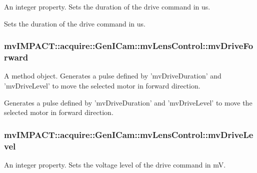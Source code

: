 An integer property. Sets the duration of the drive command in us. 

Sets the duration of the drive command in us. \hypertarget{classmv_i_m_p_a_c_t_1_1acquire_1_1_gen_i_cam_1_1mv_lens_control_a3aaebee0c8285e1be20c468a7f8e6342}{
\subsubsection[{mv\+Drive\+Forward}]{ mv\+I\+M\+P\+A\+C\+T\+::acquire\+::\+Gen\+I\+Cam\+::mv\+Lens\+Control\+::mv\+Drive\+Forward}}\label{classmv_i_m_p_a_c_t_1_1acquire_1_1_gen_i_cam_1_1mv_lens_control_a3aaebee0c8285e1be20c468a7f8e6342}


A method object. Generates a pulse defined by 'mv\+Drive\+Duration' and 'mv\+Drive\+Level' to move the selected motor in forward direction. 

Generates a pulse defined by 'mv\+Drive\+Duration' and 'mv\+Drive\+Level' to move the selected motor in forward direction. \hypertarget{classmv_i_m_p_a_c_t_1_1acquire_1_1_gen_i_cam_1_1mv_lens_control_a1575e6269e232773024c4e6896694175}{
\subsubsection[{mv\+Drive\+Level}]{ mv\+I\+M\+P\+A\+C\+T\+::acquire\+::\+Gen\+I\+Cam\+::mv\+Lens\+Control\+::mv\+Drive\+Level}}\label{classmv_i_m_p_a_c_t_1_1acquire_1_1_gen_i_cam_1_1mv_lens_control_a1575e6269e232773024c4e6896694175}


An integer property. Sets the voltage level of the drive command in m\+V. 

